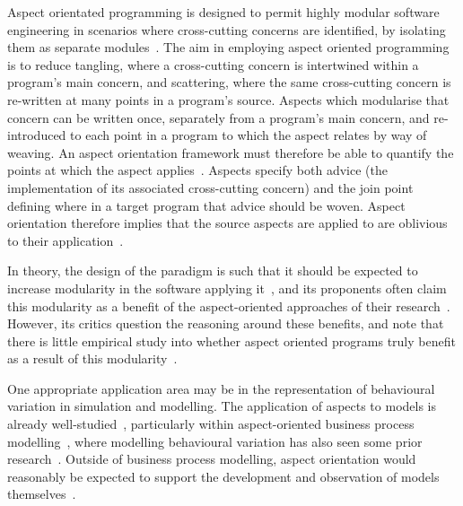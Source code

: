 Aspect orientated programming is designed to permit highly modular software
engineering in scenarios where cross-cutting concerns are identified, by
isolating them as separate modules~\cite{kiczales1997aspect}. The aim in
employing aspect oriented programming is to reduce tangling, where a
cross-cutting concern is intertwined within a program's main concern, and
scattering, where the same cross-cutting concern is re-written at many points in
a program's source. Aspects which modularise that concern can be written once,
separately from a program's main concern, and re-introduced to each point in a
program to which the aspect relates by way of weaving. An aspect orientation
framework must therefore be able to quantify the points at which the aspect
applies~\cite{filman2000aspect}. Aspects specify both advice (the implementation
of its associated cross-cutting concern) and the join point defining where in a
target program that advice should be woven. Aspect orientation therefore implies
that the source aspects are applied to are oblivious to their
application~\cite{filman2000aspect}.

In theory, the design of the paradigm is such that it should be expected to
increase modularity in the software applying
it~\cite{kiczales1997aspect,filman2000aspect}, and its
proponents often claim this modularity as a benefit of the aspect-oriented
approaches of their
research~\cite{gilani2004family,charfi2007ao4bpel,Cappelli_AOBPM,jalali2012aspect,chibani2013toward}.
However, its critics question the reasoning around these benefits, and note that
there is little empirical study into whether aspect oriented programs truly
benefit as a result of this
modularity~\cite{Constantinides04aopconsidered,steimann06paradoxical,przybylek2010wrong}.

One appropriate application area may be in the representation of behavioural
variation in simulation and modelling. The application of aspects to models is
already well-studied~\cite{DEVSaspectorientation2008aksu,chibani2013toward},
particularly within aspect-oriented business process
modelling~\cite{charfi2007ao4bpel,Cappelli_AOBPM,jalali2012aspect}, where
modelling behavioural variation has also seen some prior
research~\cite{Machado_2011,stocker2013secsy,pourmasoumi2015business,ExecutableBPMNMitsyuk}. 
Outside of business process modelling, aspect orientation would reasonably be
expected to support the development and observation of models
themselves~\cite{gulyas1999use}. 

